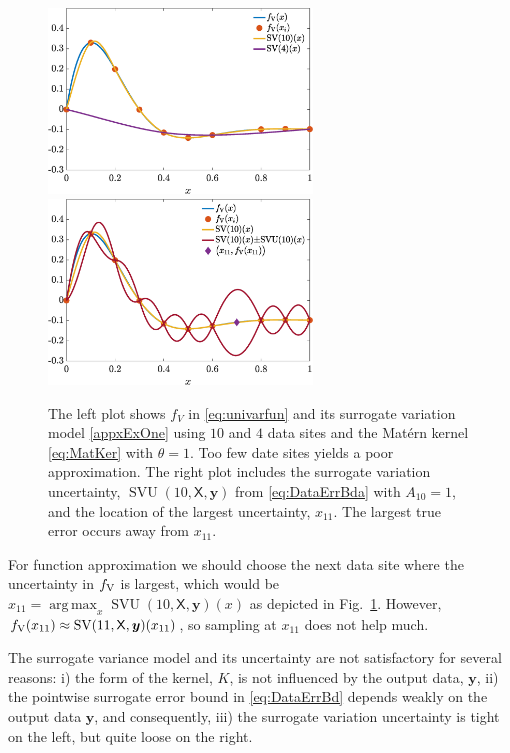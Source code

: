 \documentclass[11pt]{NSFamsart}
\DeclareMathOperator*{\argmax}{arg\,max}
\DeclareMathOperator{\SVAR}{SV} %
\DeclareMathOperator{\SVARERR}{SVU} %
\newcommand{\VAR}{\textup{V}}
\newcommand{\mX}{\mathsf{X}}
\newcommand{\by}{{\boldsymbol{y}}}
\begin{document}
\begin{figure}[ht]
    \centering
    \includegraphics[width = 7cm]{ProgramsImages/fandDataAndAppxSmall.eps} \qquad \qquad
    \includegraphics[width = 7cm]{ProgramsImages/fandDataAndAppxAndRMSPE.eps}
    \caption{The left plot shows $f_V$ in \eqref{eq:univarfun} and its surrogate variation model \eqref{appxExOne} using $10$ and $4$ data sites and the Mat\'ern kernel \eqref{eq:MatKer} with $\theta = 1$. Too few date sites yields a poor approximation.  The right plot includes the surrogate variation uncertainty, $\SVARERR(10,\mX,\by)$ from \eqref{eq:DataErrBda} with $A_{10} =1$, and the location of the largest uncertainty, $x_{11}$. The largest true error occurs away from $x_{11}$.}
    \label{fig:sampleFun}
\end{figure}

For function approximation we should choose the next data site where the uncertainty in $f_{\VAR}$ is largest, which would be $x_{11} = \argmax_x \SVARERR(10,\mX,\by)(x)$ as depicted in Fig.\ \ref{fig:sampleFun}.  However, $f_{\VAR}(x_{11}) \approx \SVAR(11,\mX,\by)(x_{11})$, so sampling at $x_{11}$ does not help much.

The surrogate variance model and its uncertainty are not satisfactory for several reasons: i) the form of the kernel, $K$, is not influenced by the output data, $\by$, ii) the pointwise surrogate error bound in \eqref{eq:DataErrBd} depends weakly on the output data $\by$, and consequently, iii) the surrogate variation uncertainty is tight on the left, but quite loose on the right. 
\end{document}

